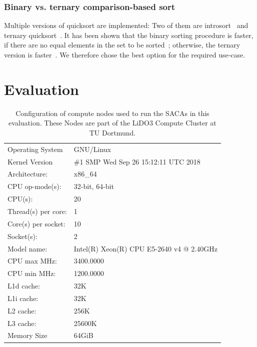 \subsubsection{Binary vs. ternary comparison-based sort}

Multiple versions of quicksort are implemented:
Two of them are introsort~\cite{Musser97} and ternary quicksort~\cite{ternary_quicksort}.
It has been shown that the binary sorting procedure is faster,
if there are no equal elements in the set to be sorted~\cite{saca:4,ternary_quicksort};
otherwise, the ternary version is faster~\cite{ternary_quicksort}.
We therefore chose the best option for the required use-case.

\section{Evaluation}

\begin{table}[t]
    \centering
    \begin{tabular}{ll}
        \toprule
        Operating System     & GNU/Linux \\
        Kernel Version       & \#1 SMP Wed Sep 26 15:12:11 UTC 2018 \\
        \midrule
        Architecture:        & x86\_64 \\
        CPU op-mode(s):      & 32-bit, 64-bit \\
        CPU(s):              & 20 \\
        Thread(s) per core:  & 1 \\
        Core(s) per socket:  & 10 \\
        Socket(s):           & 2 \\
        Model name:          & Intel(R) Xeon(R) CPU E5-2640 v4 @ 2.40GHz \\
        CPU max MHz:         & 3400.0000 \\
        CPU min MHz:         & 1200.0000 \\
        L1d cache:           & 32K \\
        L1i cache:           & 32K \\
        L2 cache:            & 256K \\
        L3 cache:            & 25600K \\
        \midrule
        Memory Size          & 64GiB \\
        \bottomrule
    \end{tabular}
    \caption{Configuration of compute nodes used to run the SACAs in this evaluation. These Nodes are part of the LiDO3 Compute Cluster at TU Dortmund.}
    \label{ea:lido}
\end{table}

